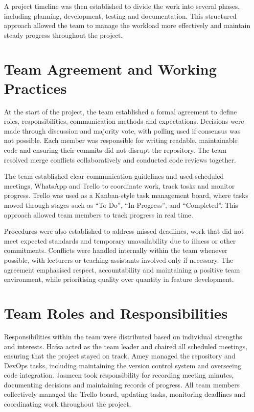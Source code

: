 A project timeline was then established to divide the work into several phases, including planning, development, testing and documentation. This structured approach allowed the team to manage the workload more effectively and maintain steady progress throughout the project.

\section{Team Agreement and Working Practices}
At the start of the project, the team established a formal agreement to define roles, responsibilities, communication methods and expectations. Decisions were made through discussion and majority vote, with polling used if consensus was not possible. Each member was responsible for writing readable, maintainable code and ensuring their commits did not disrupt the repository. The team resolved merge conflicts collaboratively and conducted code reviews together.

The team established clear communication guidelines and used scheduled meetings, WhatsApp and Trello to coordinate work, track tasks and monitor progress. Trello was used as a Kanban-style task management board, where tasks moved through stages such as “To Do”, “In Progress”, and “Completed”. This approach allowed team members to track progress in real time. 

Procedures were also established to address missed deadlines, work that did not meet expected standards and temporary unavailability due to illness or other commitments. Conflicts were handled internally within the team whenever possible, with lecturers or teaching assistants involved only if necessary. The agreement emphasised respect, accountability and maintaining a positive team environment, while prioritising quality over quantity in feature development.

\section{Team Roles and Responsibilities}
Responsibilities within the team were distributed based on individual strengths and interests. Hafsa acted as the team leader and chaired all scheduled meetings, ensuring that the project stayed on track. Amey managed the repository and DevOps tasks, including maintaining the version control system and overseeing code integration. Jasmeen took responsibility for recording meeting minutes, documenting decisions and maintaining records of progress. All team members collectively managed the Trello board, updating tasks, monitoring deadlines and coordinating work throughout the project.

